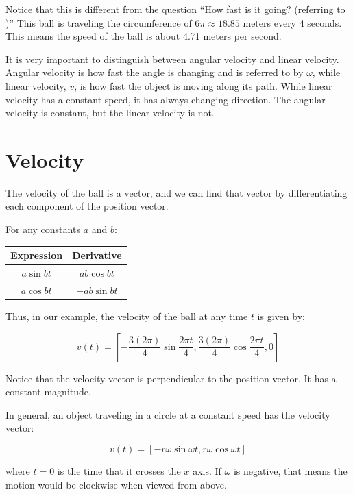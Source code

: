 Notice that this is different from the question ``How fast is it
going? (referring to )''  This ball is traveling the circumference of $6\pi \approx
18.85$ meters every 4 seconds.  This means the speed of the ball is about
4.71 meters per second.

It is very important to distinguish between angular velocity and linear velocity. Angular velocity is how fast the angle is changing and is referred to by $\omega$, while linear velocity, $v$, is how fast the object is moving along its path. While linear velocity has a constant speed, it has always changing direction. The angular velocity is constant, but the linear velocity is not.

\section{Velocity}
The velocity of the ball is a vector, and we can find that vector by
differentiating each component of the position vector.

For any constants $a$ and $b$:

\begin{tabular}{c | c }
  Expression & Derivative \\
  \hline
  $a \sin{b t}$ & $ab \cos{b t}$ \\
  $a \cos{b t}$ & $-ab \sin{b t}$  \\
\end{tabular}

Thus, in our example, the velocity of the ball at any time $t$ is given by:

$$v(t) = \left[ -\frac{3 (2\pi)}{4} \sin{\frac{2\pi t}{4}}, \frac{3(2\pi)}{4} \cos{\frac{2\pi t}{4}}, 0 \right]$$

Notice that the velocity vector is perpendicular to the position vector.  It has a constant magnitude.

In general, an object traveling in a circle at a constant speed has the velocity vector:

$$v(t) = \left[ -r\omega \sin{\omega t}, r\omega \cos{\omega t}\right]$$

where $t = 0$ is the time that it crosses the $x$ axis.  If $\omega$ is
negative, that means the motion would be clockwise when viewed from
above.

